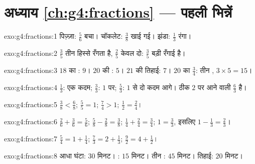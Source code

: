 \section*{अध्याय \ref{ch:g4:fractions} --- पहली भिन्नें}

\begin{solution}{exo:g4:fractions:1}
पिज़्ज़ा: $\frac56$ बचा। चॉकलेट: $\frac38$ खाई गई। झंडा:
$\frac13$ रंगा।
\end{solution}

\begin{solution}{exo:g4:fractions:2}
$\frac35$ तीन हिस्से रँगता है, $\frac25$ केवल दो: $\frac35$ बड़ी
रँगाई है।
\end{solution}

\begin{solution}{exo:g4:fractions:3}
$18$ का : $9$। $20$ की : $5$। $21$ की तिहाई: $7$।
$20$ का $\frac34$: तीन , $3 \times 5 = 15$।
\end{solution}

\begin{solution}{exo:g4:fractions:4}
$\frac13$: एक कदम; $\frac33$: $1$ पर; $\frac53$: $1$ से दो कदम
आगे। ठीक $2$ पर आने वाली  $\frac63$ है।
\end{solution}

\begin{solution}{exo:g4:fractions:5}
$\frac38 < \frac68$; \quad $\frac55 = 1$; \quad $\frac74 > 1$;
\quad $\frac12 = \frac24$।
\end{solution}

\begin{solution}{exo:g4:fractions:6}
$\frac26 + \frac36 = \frac56$; \quad
$\frac58 - \frac28 = \frac38$; \quad
$\frac14 + \frac24 = \frac34$; \quad
$1 = \frac33$, इसलिए $1 - \frac13 = \frac23$।
\end{solution}

\begin{solution}{exo:g4:fractions:7}
$\frac54 = 1 + \frac14$; \quad
$\frac73 = 2 + \frac13$; \quad
$\frac92 = 4 + \frac12$।
\end{solution}

\begin{solution}{exo:g4:fractions:8}
आधा घंटा: $30$ मिनट। : $15$ मिनट। तीन : $45$
मिनट। तिहाई: $20$ मिनट।
\end{solution}


